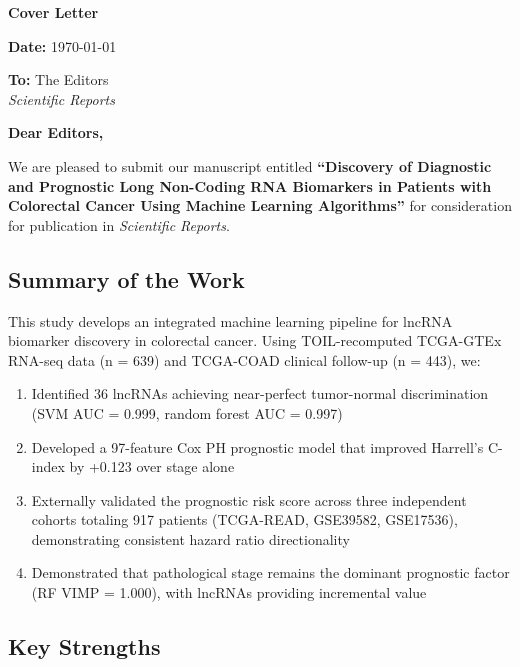 \documentclass[fleqn,10pt]{wlscirep}
\begin{document}
\thispagestyle{empty}

\begin{center}
{\LARGE \textbf{Cover Letter}}
\end{center}

\vspace{1cm}

\textbf{Date:} \today

\textbf{To:} The Editors \\
\textit{Scientific Reports}

\vspace{0.5cm}

\textbf{Dear Editors,}

We are pleased to submit our manuscript entitled \textbf{``Discovery of Diagnostic and Prognostic Long Non-Coding RNA Biomarkers in Patients with Colorectal Cancer Using Machine Learning Algorithms''} for consideration for publication in \textit{Scientific Reports}.

\subsection*{Summary of the Work}

This study develops an integrated machine learning pipeline for lncRNA biomarker discovery in colorectal cancer. Using TOIL-recomputed TCGA-GTEx RNA-seq data (n = 639) and TCGA-COAD clinical follow-up (n = 443), we:

\begin{enumerate}
    \item Identified 36 lncRNAs achieving near-perfect tumor-normal discrimination (SVM AUC = 0.999, random forest AUC = 0.997)
    \item Developed a 97-feature Cox PH prognostic model that improved Harrell's C-index by +0.123 over stage alone
    \item Externally validated the prognostic risk score across three independent cohorts totaling 917 patients (TCGA-READ, GSE39582, GSE17536), demonstrating consistent hazard ratio directionality
    \item Demonstrated that pathological stage remains the dominant prognostic factor (RF VIMP = 1.000), with lncRNAs providing incremental value
\end{enumerate}

\subsection*{Key Strengths}
\end{document}
